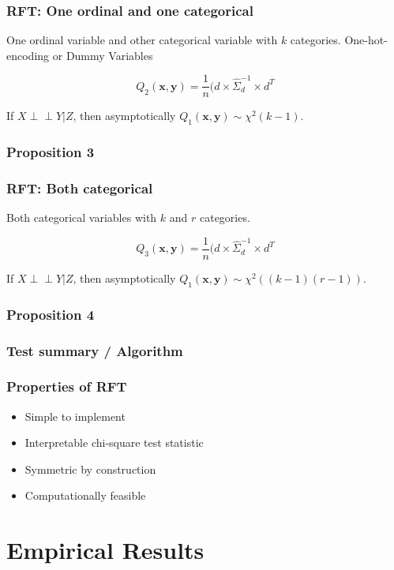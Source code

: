 \documentclass{beamer}
\def\ci{\perp\!\!\!\!\!\perp}
\begin{document}
\begin{frame}
	\frametitle{RFT: One ordinal and one categorical}
	One ordinal variable and other categorical variable with $ k $ categories.
	One-hot-encoding or Dummy Variables


	$$ Q_2(\bm{x}, \bm{y}) = \frac{1}{n} (d \times \hat{\Sigma}_d^{-1} \times d^T $$

	If $ X \ci Y | Z $, then asymptotically $ Q_1(\bm{x}, \bm{y}) \sim \chi^2(k-1) $.
\end{frame}

\begin{frame}
	\frametitle{Proposition 3}
\end{frame}

\begin{frame}
	\frametitle{RFT: Both categorical}
	Both categorical variables with $ k $ and $ r $ categories.


	$$ Q_3(\bm{x}, \bm{y}) = \frac{1}{n} (d \times \hat{\Sigma}_d^{-1} \times d^T $$

	If $ X \ci Y | Z $, then asymptotically $ Q_1(\bm{x}, \bm{y}) \sim
	\chi^2((k-1)(r-1)) $.
\end{frame}

\begin{frame}
	\frametitle{Proposition 4}
\end{frame}

\begin{frame}
	\frametitle{Test summary / Algorithm}

\end{frame}

\begin{frame}
	\frametitle{Properties of RFT}
	\begin{itemize}
		\item Simple to implement
		\item Interpretable chi-square test statistic
		\item Symmetric by construction
		\item Computationally feasible
	\end{itemize}
\end{frame}

\section{Empirical Results}
\end{document}
